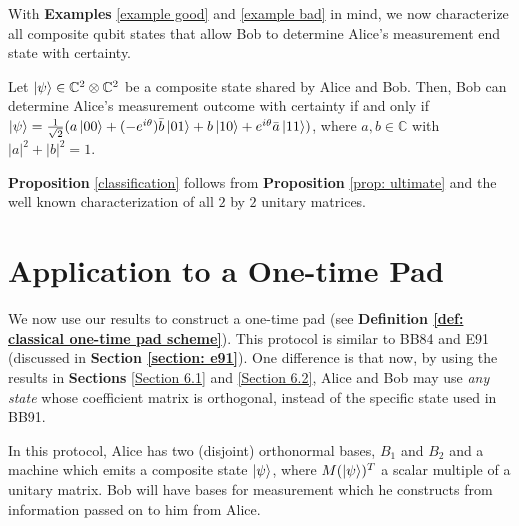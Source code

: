 


With {\bf{Examples}} \ref{example good} and \ref{example bad} in mind, we now characterize all composite qubit states that allow Bob to determine Alice's measurement end state with certainty.  
\begin{prop}
\label{classification}
Let $\ket{\psi} \in {\mathbb{C}}^2 \otimes {\mathbb{C}}^2$ be a composite state shared by Alice and Bob.  Then, Bob can determine Alice's measurement outcome with certainty if and only if $\ket{\psi}=\frac{1}{\sqrt{2}}(a\ket{00}+(-e^{i\theta})\Bar{b}\ket{01}+b\ket{10}+e^{i\theta}\Bar{a}\ket{11})$, where $a, b \in \mathbb{C}$ with $|a|^2+|b|^2=1$.
\end{prop}
{\bf{Proposition}} \ref{classification} follows from {\bf{Proposition}} \ref{prop: ultimate} and the well known characterization of all $2$ by $2$ unitary matrices.


\pagebreak

\section{Application to a One-time Pad}\label{section: application to a one-time pad}


We now use our results to construct a one-time pad (see \textbf{Definition \ref{def: classical one-time pad scheme}}). This protocol is similar to BB84 and E91 (discussed in \textbf{Section \ref{section: e91}}).  One difference is that now, by using the results in {\bf{Sections}} \ref{Section 6.1} and \ref{Section 6.2}, Alice and Bob may use {\emph{any state}} whose coefficient matrix is orthogonal, instead of the specific state used in BB91.  


\begin{comment}
\begin{figure}[h]
    \centering
    \texttt{[image: "protocol diagram".png]}
    \label{fig:protocol diagram}
\end{figure}
\end{comment}

In this protocol, Alice has two (disjoint) orthonormal bases, $B_1$ and $B_2$ and a machine which emits a composite state $\ket{\psi}$, where $M(\ket{\psi})^T$ a scalar multiple of a unitary matrix.  Bob will have bases for measurement which he constructs from information passed on to him from Alice.

